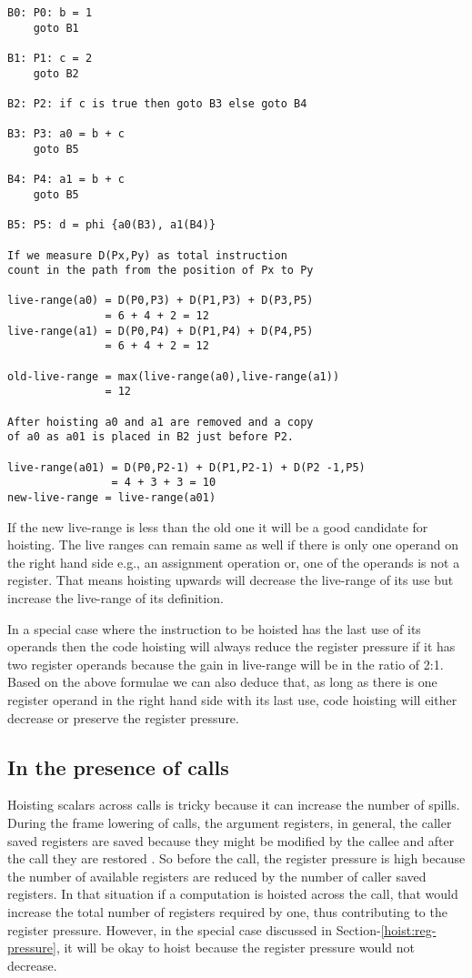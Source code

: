 \documentclass{sig-alternate}
\begin{document}
\begin{verbatim}
B0: P0: b = 1
    goto B1

B1: P1: c = 2
    goto B2

B2: P2: if c is true then goto B3 else goto B4

B3: P3: a0 = b + c
    goto B5

B4: P4: a1 = b + c
    goto B5

B5: P5: d = phi {a0(B3), a1(B4)}

If we measure D(Px,Py) as total instruction
count in the path from the position of Px to Py

live-range(a0) = D(P0,P3) + D(P1,P3) + D(P3,P5)
               = 6 + 4 + 2 = 12
live-range(a1) = D(P0,P4) + D(P1,P4) + D(P4,P5)
               = 6 + 4 + 2 = 12

old-live-range = max(live-range(a0),live-range(a1))
               = 12

After hoisting a0 and a1 are removed and a copy
of a0 as a01 is placed in B2 just before P2.

live-range(a01) = D(P0,P2-1) + D(P1,P2-1) + D(P2 -1,P5)
                = 4 + 3 + 3 = 10
new-live-range = live-range(a01)
\end{verbatim}

If the new live-range is less than the old one it will be a good candidate for
hoisting. The live ranges can remain same as well if there is only one operand
on the right hand side e.g., an assignment operation or, one of the operands is
not a register. That means hoisting upwards will decrease the live-range of its
use but increase the live-range of its definition.

In a special case where the instruction to be hoisted has the last use of its
operands then the code hoisting will always reduce the register pressure if it
has two register operands because the gain in live-range will be in the ratio of
2:1. Based on the above formulae we can also deduce that, as long as there is
one register operand in the right hand side with its last use, code hoisting
will either decrease or preserve the register pressure.

\subsection{In the presence of calls}
\label{cost:across-calls}
Hoisting scalars across calls is tricky because it can increase the number of
spills. During the frame lowering of calls, the argument registers, in general,
the caller saved registers are saved because they might be modified by the
callee and after the call they are restored \cite{frame-lowering}. So before the
call, the register pressure is high because the number of available registers
are reduced by the number of caller saved registers. In that situation if a
computation is hoisted across the call, that would increase the total number of
registers required by one, thus contributing to the register pressure. However,
in the special case discussed in Section-\ref{hoist:reg-pressure}, it will be
okay to hoist because the register pressure would not decrease.
\end{document}
